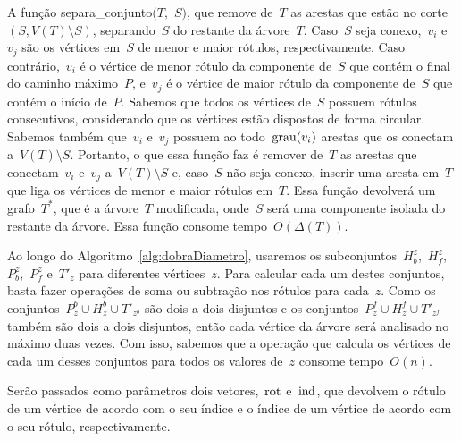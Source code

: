 		A função {\sc separa\_conjunto}$(T,$ $S)$,
		que remove de~$T$ as arestas que estão no 
		corte~$(S, V(T)\setminus S)$, separando~$S$ do restante
		da árvore~$T$.
		Caso~$S$ seja conexo,~$v_i$ e~$v_j$ são os vértices em~$S$ 
		de menor e maior rótulos, respectivamente.
		Caso contrário,~$v_i$ é o vértice de menor rótulo
		da componente de~$S$ que contém o final do caminho máximo~$P$,
		e~$v_j$ é o vértice de maior rótulo da componente de~$S$ que
		contém o início de~$P$.
		Sabemos que todos os vértices de~$S$ possuem
		rótulos consecutivos,
		considerando que os vértices estão dispostos de forma circular.
		Sabemos também que~$v_i$ e~$v_j$ possuem ao todo~${\mathrm{grau}(v_i)}$
		arestas que os conectam a~$V(T)\setminus S$.
		Portanto, o que essa função faz é remover de~$T$ as arestas que 
		conectam~$v_i$ e~$v_j$ a~$V(T)\setminus S$ e, caso~$S$ não seja
		conexo, inserir uma aresta em~$T$ que liga os vértices de menor e maior 
		rótulos em~$T$.
		Essa função devolverá um grafo~$T^*$, que é a árvore~$T$ modificada,
		onde~$S$ será uma componente
		isolada do restante da árvore. 
		Essa função consome tempo~$O(\Delta(T))$.

		Ao longo do Algoritmo~\ref{alg:dobraDiametro}, usaremos
		os subconjuntos~$H_b^z$,~$H_f^z$,~$P_b^z$,~$P_f^z$ e~$T'_z$
		para diferentes vértices~$z$.
		Para calcular cada um destes conjuntos, basta fazer operações
		de soma ou subtração
		nos rótulos para cada~$z$.
		Como os conjuntos~${P^b_z\cup H^b_z\cup T'_{z^b}}$ são dois a dois disjuntos
		e os conjuntos~${P^f_z\cup H^f_z\cup T'_{z^f}}$ também são dois a dois disjuntos,
		então cada vértice da árvore será analisado no máximo duas vezes.
		Com isso, sabemos que a operação que calcula os vértices de cada um desses 
		conjuntos para todos os valores de~$z$ consome tempo~$O(n)$.

		Serão passados como parâmetros dois vetores,~$\mathrm{rot}$ e~$\mathrm{ind}$,
		que devolvem o rótulo de um vértice de acordo com o seu índice
		e o índice de um vértice de 
		acordo com o seu rótulo, respectivamente.


